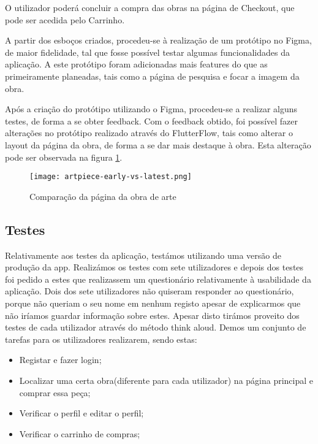 \documentclass[conference]{IEEEtran}
\begin{document}
O utilizador poderá concluir a compra das obras na página de Checkout, que pode ser acedida pelo Carrinho.

A partir dos esboços criados, procedeu-se à realização de um protótipo no Figma, de maior fidelidade, tal que 
fosse possível testar algumas funcionalidades da aplicação. A este protótipo foram adicionadas mais features do 
que as primeiramente planeadas, tais como a página de pesquisa e focar a imagem da obra.

Após a criação do protótipo utilizando o Figma, procedeu-se a realizar alguns testes, de forma a se obter feedback. 
Com o feedback obtido, foi possível fazer alterações no protótipo realizado através do FlutterFlow, tais como 
alterar o layout da página da obra, de forma a se dar mais destaque à obra. Esta alteração pode ser observada na 
figura \ref{fig:earlyvslate}.

\begin{figure}[h]
    \centering
    \texttt{[image: artpiece-early-vs-latest.png]}
    \caption{Comparação da página da obra de arte}
    \label{fig:earlyvslate}
\end{figure}



\subsection{Testes}

Relativamente aos testes da aplicação, testámos utilizando uma versão de produção da app. Realizámos os testes com sete utilizadores e depois dos testes foi pedido a estes que realizassem um questionário relativamente à usabilidade da aplicação. Dois dos sete utilizadores não quiseram responder ao questionário, porque não queriam o seu nome em nenhum registo apesar de explicarmos que não iríamos guardar informação sobre estes. Apesar disto tirámos proveito dos testes de cada utilizador através do método think aloud. Demos um conjunto de tarefas para os utilizadores realizarem, sendo estas:

\begin{itemize}
    \item Registar e fazer login;
    \item Localizar uma certa obra(diferente para cada utilizador) na página principal e comprar essa peça;
    \item Verificar o perfil e editar o perfil;
    \item Verificar o carrinho de compras;
\end{itemize}
\end{document}
